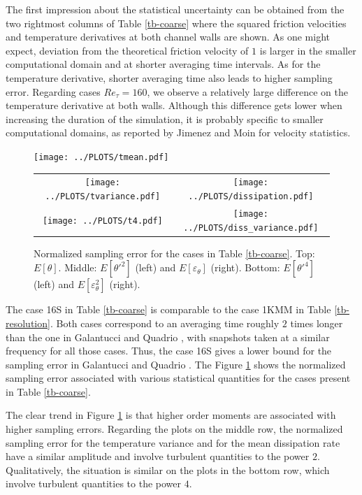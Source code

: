 \documentclass[review]{elsarticle}
\newcommand{\gqcite}{Galantucci and Quadrio \cite{galantucci2010very}}
\newcommand{\epst}{\varepsilon_\theta}
\begin{document}
The first impression about the statistical uncertainty can be obtained from the two {\color{red} rightmost} columns of Table \ref{tb-coarse} where the squared friction velocities and temperature derivatives at both channel walls are shown. As one might expect, deviation from the theoretical friction velocity of $1$ is larger in the smaller computational domain and at shorter averaging time intervals. As for the temperature derivative, shorter averaging time also leads to higher sampling error. Regarding cases $Re_\tau=160$, we observe a relatively large difference on the temperature derivative at both walls. Although this difference gets lower when increasing the duration of the simulation, it is probably specific to smaller computational domains, as reported by Jimenez and Moin \cite{jimenez1991minimal} for velocity statistics.

\begin{figure}[htbp]
\begin{center}
\texttt{[image: ../PLOTS/tmean.pdf]}
\begin{tabular}{cc}
\texttt{[image: ../PLOTS/tvariance.pdf]} & 
\texttt{[image: ../PLOTS/dissipation.pdf]} \\
\texttt{[image: ../PLOTS/t4.pdf]} & 
\texttt{[image: ../PLOTS/diss\_variance.pdf]}
\end{tabular}
\end{center}
\caption{Normalized sampling error for the cases in Table \ref{tb-coarse}. Top: $E\left[ \theta \right]$. Middle: $E\left[ \theta'^2 \right]$ (left) and $E\left[ \epst \right]$ (right). Bottom: $E\left[ \theta'^4 \right]$ (left) and $E\left[ \epst^2 \right]$ (right).}
\label{fig-coarse}
\end{figure}

The case 16S in Table \ref{tb-coarse} is comparable to the case 1KMM in Table \ref{tb-resolution}. Both cases correspond to an averaging time roughly $2$ times longer than the one in \gqcite, with snapshots taken at a similar frequency for all those cases. Thus, the case 16S gives a lower bound for the sampling error in \gqcite. The Figure \ref{fig-coarse} shows the normalized sampling error associated with various statistical quantities for the cases present in Table \ref{tb-coarse}.

The clear trend {\color{red}in Figure \ref{fig-coarse}} is that higher order moments are associated with higher sampling errors. Regarding the plots on the middle row, the normalized sampling error for the temperature variance and for the mean dissipation rate have a similar amplitude and involve turbulent quantities to the power $2$. Qualitatively, the situation is similar on the plots in the bottom row, which involve turbulent quantities to the power $4$.
\end{document}
